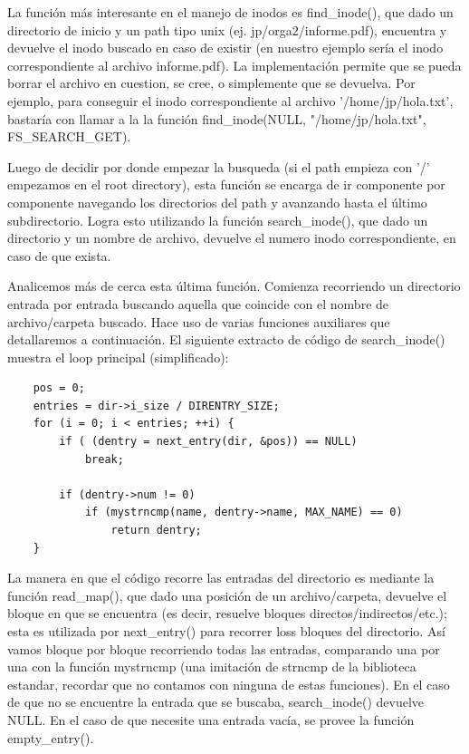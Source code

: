 La función más interesante en el manejo de inodos es find\_inode(), que dado un
directorio de inicio y un path tipo unix (ej. jp/orga2/informe.pdf), encuentra y
devuelve el inodo buscado en caso de existir (en nuestro ejemplo sería el inodo
correspondiente al archivo informe.pdf). La implementación permite que se pueda
borrar el archivo en cuestion, se cree, o simplemente que se devuelva. Por
ejemplo, para conseguir el inodo correspondiente al archivo '/home/jp/hola.txt',
bastaría con llamar a la la función find\_inode(NULL, "/home/jp/hola.txt",
FS\_SEARCH\_GET).

Luego de decidir por donde empezar la busqueda (si el path empieza con '/'
empezamos en el root directory), esta función se encarga de ir componente por
componente navegando los directorios del path y avanzando hasta el último
subdirectorio. Logra esto utilizando la función search\_inode(), que dado un
directorio y un nombre de archivo, devuelve el numero inodo correspondiente, en
caso de que exista.

Analicemos más de cerca esta última función. Comienza recorriendo un
directorio entrada por entrada buscando aquella que coincide con el nombre de
archivo/carpeta buscado. Hace uso de varias funciones auxiliares que
detallaremos a continuación. El siguiente extracto de código de search\_inode()
muestra el loop principal (simplificado):

\begin{verbatim}
    pos = 0;
    entries = dir->i_size / DIRENTRY_SIZE;
    for (i = 0; i < entries; ++i) {
        if ( (dentry = next_entry(dir, &pos)) == NULL)
            break;

        if (dentry->num != 0)
            if (mystrncmp(name, dentry->name, MAX_NAME) == 0)
                return dentry;
    }
\end{verbatim}

La manera en que el código recorre las entradas del directorio es mediante la
función read\_map(), que dado una posición de un archivo/carpeta, devuelve el
bloque en que se encuentra (es decir, resuelve bloques
directos/indirectos/etc.); esta es utilizada por next\_entry() para recorrer
loss bloques del directorio. Así vamos bloque por bloque recorriendo
todas las entradas, comparando una por una con la función
mystrncmp (una imitación de strncmp de la biblioteca estandar, recordar que no
contamos con ninguna de estas funciones). En el caso de que no se encuentre la
entrada que se buscaba, search\_inode() devuelve NULL. En el caso de que
necesite una entrada vacía, se provee la función empty\_entry().


